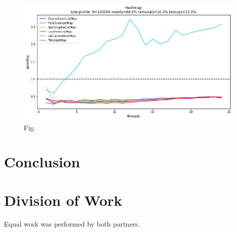 \documentclass[11pt]{article}
\begin{document}
\begin{figure}[h]
\centering
\includegraphics[width=0.5\linewidth]{figs/lateday/combined/lateday_combined_map_insert_80_lookup_10_removal_10}
\caption{Fig.}
\label{fig:fig2}
\end{figure}

\section{Conclusion}

\section{Division of Work}
Equal work was performed by both partners.




\printbibliography
\end{document}

